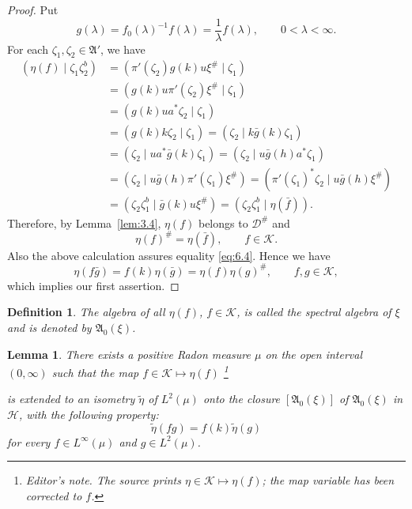 \documentclass[12pt,b5paper,twoside]{article}
\theoremstyle{takesaki}
\newtheorem{lemma}{Lemma}[section]
\newtheorem{definition}{Definition}[section]
\numberwithin{equation}{section}
\newcounter{editorialnote}
\newcommand{\ednote}[1]{%
  \stepcounter{editorialnote}%
  \begingroup
  \renewcommand{\thefootnote}{E\arabic{editorialnote}}%
  \footnote{\textit{Editor's note.} #1}%
  \addtocounter{footnote}{-1}%
  \endgroup
}
\begin{document}
\begin{proof}
Put
\[
 g(\lambda)=f_0(\lambda)^{-1}f(\lambda)
 =\frac1\lambda f(\lambda),\qquad0<\lambda<\infty.
\]
For each $\zeta_1,\zeta_2\in\mathfrak A'$, we have
\begin{align*}
 (\eta(f)\mid\zeta_1\zeta_2^b)
  &=(\pi'(\zeta_2)g(k)u\xi^\#\mid\zeta_1)\\
  &=(g(k)u\pi'(\zeta_2)\xi^\#\mid\zeta_1)\\
  &=(g(k)ua^*\zeta_2\mid\zeta_1)\\
  &=(g(k)k\zeta_2\mid\zeta_1)
   =(\zeta_2\mid k\bar g(k)\zeta_1)\\
  &=(\zeta_2\mid ua^*\bar g(k)\zeta_1)
   =(\zeta_2\mid u\bar g(h)a^*\zeta_1)\\
  &=(\zeta_2\mid u\bar g(h)\pi'(\zeta_1)\xi^\#)
   =(\pi'(\zeta_1)^*\zeta_2\mid u\bar g(h)\xi^\#)\\
  &=(\zeta_2\zeta_1^b\mid\bar g(k)u\xi^\#)
   =(\zeta_2\zeta_1^b\mid\eta(\bar f)).
\end{align*}
Therefore, by Lemma~\ref{lem:3.4}, $\eta(f)$ belongs to
$\mathcal D^\#$ and
\begin{equation}
 \eta(f)^\#=\eta(\bar f),\qquad f\in\mathcal K.
 \tag{6.5}\label{eq:6.5}
\end{equation}
Also the above calculation assures equality \eqref{eq:6.4}.  Hence we
have
\begin{equation}
 \eta(f\bar g)=f(k)\eta(\bar g)
 =\eta(f)\eta(g)^\#,\qquad f,g\in\mathcal K,
 \tag{6.6}\label{eq:6.6}
\end{equation}
which implies our first assertion.
\end{proof}

\begin{definition}\label{def:6.1}
The algebra of all $\eta(f)$, $f\in\mathcal K$, is called the spectral
algebra of $\xi$ and is denoted by $\mathfrak A_0(\xi)$.
\end{definition}

\begin{lemma}\label{lem:6.2}
There exists a positive Radon measure $\mu$ on the open interval
$(0,\infty)$ such that the map $f\in\mathcal K\mapsto\eta(f)$\ednote{The
source prints $\eta\in\mathcal K\mapsto\eta(f)$; the map variable has
been corrected to $f$.} is
extended to an isometry $\widetilde\eta$ of $L^2(\mu)$ onto the closure
$[\mathfrak A_0(\xi)]$ of $\mathfrak A_0(\xi)$ in $\mathcal H$, with
the following property:
\begin{equation}
 \widetilde\eta(fg)=f(k)\widetilde\eta(g)
 \tag{6.7}\label{eq:6.7}
\end{equation}
for every $f\in L^\infty(\mu)$ and $g\in L^2(\mu)$.
\end{lemma}
\end{document}
